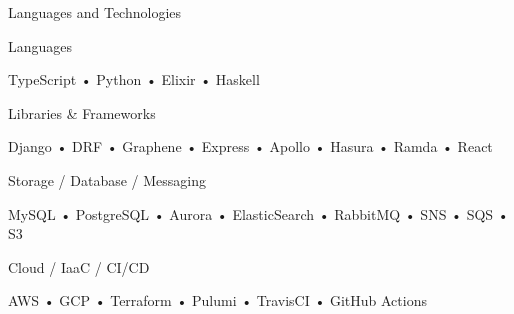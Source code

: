 \documentclass[]{Arroyo}
\newenvironment{tightcenter}{%
  \setlength\topsep{0pt}
  \setlength\parskip{4pt}
  \begin{center}
}{%
  \end{center}
}
\begin{document}
	\begin{cvsection}{Languages and Technologies}
		\begin{cvsubsection}{}{Languages}{}	
			\begin{tightcenter}
				TypeScript • Python • Elixir • Haskell
			\end{tightcenter}
		\end{cvsubsection}
		\begin{cvsubsection}{}{Libraries \& Frameworks}{}	
			\begin{tightcenter}
				Django • DRF • Graphene • Express • Apollo • Hasura • Ramda • React
			\end{tightcenter}
		\end{cvsubsection}
		\begin{cvsubsection}{}{Storage / Database / Messaging}{}	
			\begin{tightcenter}
				MySQL • PostgreSQL • Aurora • ElasticSearch • RabbitMQ • SNS • SQS • S3 
			\end{tightcenter}
		\end{cvsubsection}
		\begin{cvsubsection}{}{Cloud / IaaC / CI/CD}{}	
			\begin{tightcenter}
				AWS • GCP • Terraform • Pulumi • TravisCI • GitHub Actions
			\end{tightcenter}
		\end{cvsubsection}
	\end{cvsection}
	
\end{document}
